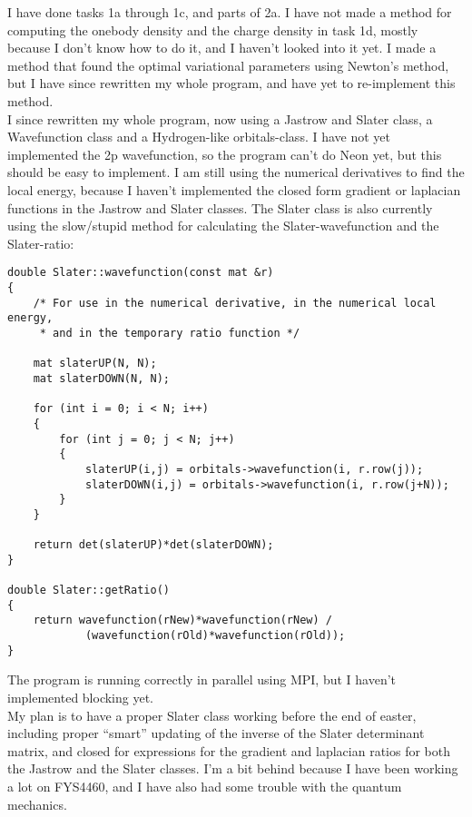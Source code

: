 I have done tasks 1a through 1c, and parts of 2a. I have not made a method for computing the onebody density and the charge density in task 1d, mostly because I don't know how to do it, and I haven't looked into it yet. I made a method that found the optimal variational parameters using Newton's method, but I have since rewritten my whole program, and have yet to re-implement this method. \\

I since rewritten my whole program, now using a Jastrow and Slater class, a Wavefunction class and a Hydrogen-like orbitals-class. I have not yet implemented the 2p wavefunction, so the program can't do Neon yet, but this should be easy to implement. I am still using the numerical derivatives to find the local energy, because I haven't implemented the closed form gradient or laplacian functions in the Jastrow and Slater classes. The Slater class is also currently using the slow/stupid method for calculating the Slater-wavefunction and the Slater-ratio:
\begin{lstlisting}
double Slater::wavefunction(const mat &r)
{
    /* For use in the numerical derivative, in the numerical local energy,
     * and in the temporary ratio function */

    mat slaterUP(N, N);
    mat slaterDOWN(N, N);

    for (int i = 0; i < N; i++)
    {
        for (int j = 0; j < N; j++)
        {
            slaterUP(i,j) = orbitals->wavefunction(i, r.row(j));
            slaterDOWN(i,j) = orbitals->wavefunction(i, r.row(j+N));
        }
    }

    return det(slaterUP)*det(slaterDOWN);
}

double Slater::getRatio()
{
    return wavefunction(rNew)*wavefunction(rNew) /
            (wavefunction(rOld)*wavefunction(rOld));
}
\end{lstlisting}

The program is running correctly in parallel using MPI, but I haven't implemented blocking yet. \\

My plan is to have a proper Slater class working before the end of easter, including proper ``smart'' updating of the inverse of the Slater determinant matrix, and closed for expressions for the gradient and laplacian ratios for both the Jastrow and the Slater classes. I'm a bit behind because I have been working a lot on FYS4460, and I have also had some trouble with the quantum mechanics.
